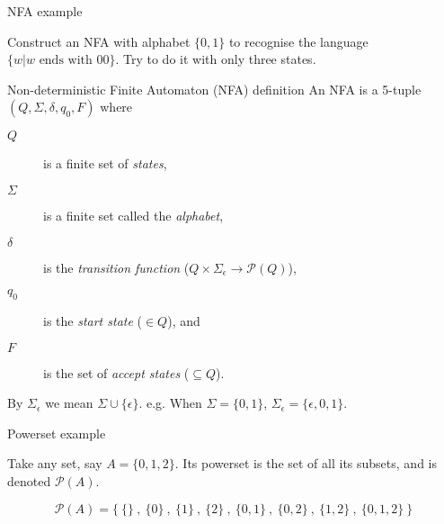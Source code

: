 \documentclass{beamer}
\begin{document}
\begin{frame}[fragile]{NFA example}
  \begin{center}
    Construct an NFA with alphabet $\{0, 1\}$ to recognise the language $\{ w| w \textrm{ ends with } 00\}$. Try to do it with only three states.
  \end{center}
  \begin{center}
  \end{center}
\end{frame}


\begin{frame}[fragile]{Non-deterministic Finite Automaton (NFA) definition}
  An NFA is a 5-tuple $(Q,\Sigma,\delta,q_0,F)$ where
  \begin{description}
    \item[$Q$] is a finite set of \emph{states},
    \item[$\Sigma$] is a finite set called the \emph{alphabet},
    \item[$\delta$] is the \emph{transition function} ($Q \times \Sigma_{\epsilon} \rightarrow \mathcal{P}(Q)$),
    \item[$q_0$] is the \emph{start state} ($\in Q$), and
    \item[$F$] is the set of \emph{accept states} ($\subseteq Q$). 
  \end{description}
  \vspace{5mm}
  By $\Sigma_{\epsilon}$ we mean $\Sigma \cup \{ \epsilon \}$.
  e.g. When $\Sigma = \{0,1\}$, $\Sigma_{\epsilon} = \{\epsilon,0,1\}.$
\end{frame}

\begin{frame}[fragile]{Powerset example}

  Take any set, say $A = \{0,1,2\}$.
  Its powerset is the set of all its subsets, and is denoted $\mathcal{P}(A)$.


  $$
  \mathcal{P}(A) = \Big\{ \ 
                      \{ \} \  , \  \{ 0 \} \  , \  \{ 1 \} \  ,\   \{ 2 \} \  , \ 
                      \{ 0,1 \} \  , \  \{ 0,2 \} \  , \  \{ 1,2 \} \  , \ 
                      \{ 0,1,2 \} \ 
                    \Big\}
  $$


\end{frame}
\end{document}
